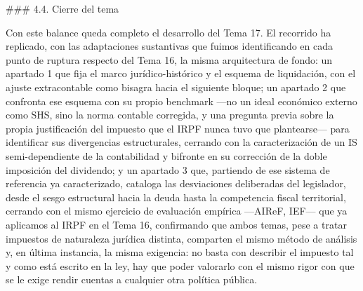\documentclass[10pt,a4paper]{article}
\begin{document}
### 4.4. Cierre del tema

Con este balance queda completo el desarrollo del Tema 17. El recorrido ha replicado, con las adaptaciones sustantivas que fuimos identificando en cada punto de ruptura respecto del Tema 16, la misma arquitectura de fondo: un apartado 1 que fija el marco jurídico-histórico y el esquema de liquidación, con el ajuste extracontable como bisagra hacia el siguiente bloque; un apartado 2 que confronta ese esquema con su propio benchmark —no un ideal económico externo como SHS, sino la norma contable corregida, y una pregunta previa sobre la propia justificación del impuesto que el IRPF nunca tuvo que plantearse— para identificar sus divergencias estructurales, cerrando con la caracterización de un IS semi-dependiente de la contabilidad y bifronte en su corrección de la doble imposición del dividendo; y un apartado 3 que, partiendo de ese sistema de referencia ya caracterizado, cataloga las desviaciones deliberadas del legislador, desde el sesgo estructural hacia la deuda hasta la competencia fiscal territorial, cerrando con el mismo ejercicio de evaluación empírica —AIReF, IEF— que ya aplicamos al IRPF en el Tema 16, confirmando que ambos temas, pese a tratar impuestos de naturaleza jurídica distinta, comparten el mismo método de análisis y, en última instancia, la misma exigencia: no basta con describir el impuesto tal y como está escrito en la ley, hay que poder valorarlo con el mismo rigor con que se le exige rendir cuentas a cualquier otra política pública.
\end{document}
